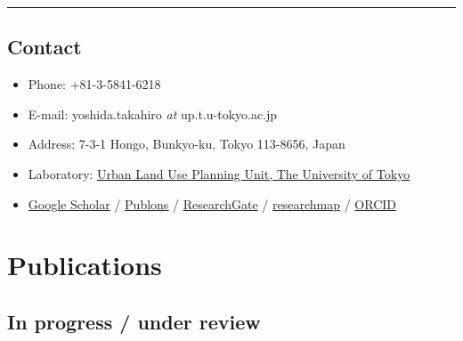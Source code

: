 \documentclass[]{book}
\providecommand{\tightlist}{%
  \setlength{\itemsep}{0pt}\setlength{\parskip}{0pt}}
\begin{document}
\begin{center}\rule{0.5\linewidth}{0.5pt}\end{center}

\hypertarget{contact}{%
\section*{Contact}\label{contact}}

\begin{itemize}
\tightlist
\item
  Phone: +81-3-5841-6218
\item
  E-mail: yoshida.takahiro \emph{at} up.t.u-tokyo.ac.jp
\item
  Address: 7-3-1 Hongo, Bunkyo-ku, Tokyo 113-8656, Japan
\item
  Laboratory: \href{http://up.t.u-tokyo.ac.jp/index-j.html}{Urban Land Use Planning Unit, The University of Tokyo}
\item
  \href{https://scholar.google.co.jp/citations?user=bYbQYeUAAAAJ\&hl=ja}{Google Scholar} / \href{https://publons.com/researcher/2909576/takahiro-yoshida/}{Publons} / \href{https://www.researchgate.net/profile/Takahiro_Yoshida5}{ResearchGate} / \href{https://researchmap.jp/yoshida.takahiro}{researchmap} / \href{https://orcid.org/0000-0001-8741-5345}{ORCID}
\end{itemize}

\hypertarget{publications}{%
\chapter*{Publications}\label{publications}}

\hypertarget{in-progress-under-review}{%
\section*{In progress / under review}\label{in-progress-under-review}}
\end{document}
